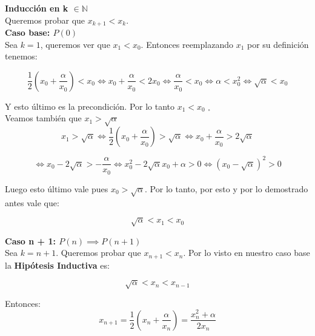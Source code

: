 {\large \bf Inducción en k $\in \mathbb{N}$}\\
Queremos probar que $x_{k + 1} < x_k$.\\

{\bf Caso base: $P(0)$}\\
Sea $k = 1$, queremos ver que $x_1 < x_0$. Entonces reemplazando $x_1$ por su definición tenemos:

\begin{displaymath}
    \frac{1}{2}(x_0 + \frac{\alpha}{x_0}) < x_0 \iff x_0 + \frac{\alpha}{x_0} < 2x_0 \iff \frac{\alpha}{x_0} < x_0 \iff \alpha < x_0^2 \iff \sqrt{\alpha} < x_0
\end{displaymath}

Y esto último es la precondición. Por lo tanto $x_1 < x_0$ $_\square$\\

Veamos también que $x_1 > \sqrt{\alpha}$\\

\begin{displaymath}
    x_1 > \sqrt{\alpha} \iff \frac{1}{2}(x_0 + \frac{\alpha}{x_0}) > \sqrt{\alpha} \iff x_0 + \frac{\alpha}{x_0} > 2\sqrt{\alpha}
\end{displaymath}

\begin{displaymath}
    \iff x_0 - 2\sqrt{\alpha} > -\frac{\alpha}{x_0} \iff x_0^2 - 2\sqrt{\alpha}x_0 + \alpha > 0 \iff (x_0 - \sqrt{\alpha})^2 > 0
\end{displaymath}

Luego esto último vale pues $x_0 > \sqrt{\alpha}$. Por lo tanto, por esto y por lo demostrado antes vale que:

\begin{displaymath}
    \sqrt{\alpha} < x_1 < x_0
\end{displaymath}

{\bf Caso n + 1: $P(n) \implies P(n + 1)$}\\
Sea $k = n + 1$. Queremos probar que $x_{n + 1} < x_n$. Por lo visto en nuestro caso base la {\bf Hipótesis Inductiva} es:

\begin{displaymath}
    \sqrt{\alpha} < x_n < x_{n - 1}
\end{displaymath}

Entonces:
\begin{displaymath}
    x_{n + 1} = \frac{1}{2}(x_n + \frac{\alpha}{x_n}) = \frac{x_n^2 + \alpha}{2x_n}
\end{displaymath}


